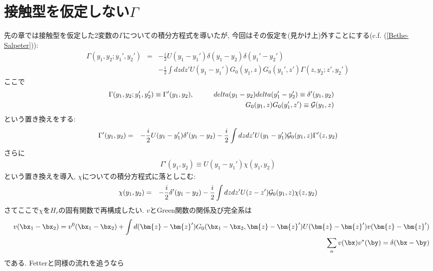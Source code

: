 \documentclass[10.5pt,a4paper]{jreport}
\begin{document}
\section{接触型を仮定しない$\Gamma$}
先の章では接触型を仮定した2変数の$\Gamma$についての積分方程式を導いたが, 今回はその仮定を(見かけ上)外すことにする(c.f. (\ref{Bethe-Salpeter})):
\begin{eqnarray}
\nonumber  \Gamma(y_1, y_2; y_1', y_2') &=& -\frac{i}{2}U(y_1 - y_1')\delta(y_1 - y_2)\delta(y_1' - y_2')\\
  &&- \frac{i}{2}\int dzdz' U(y_1 - y_1')G_0(y_1, z)G_0(y_1', z')\Gamma(z, y_2; z', y_2')
\end{eqnarray}
ここで
\begin{eqnarray}
  &&\Gamma(y_1, y_2;y_1', y_2') \equiv \Gamma'(y_1, y_2), \hspace{1cm}delta(y_1-y_2)delta(y_1'-y_2') \equiv \delta'(y_1, y_2)\\
  &&G_0(y_1, z)G_0(y_1', z') \equiv {\cal G}(y_1, z)
\end{eqnarray}
という置き換えをする:
\begin{eqnarray}
\nonumber  \Gamma'(y_1, y_2) &=& -\frac{i}{2}U(y_1 - y_1')\delta'(y_1 - y_2)- \frac{i}{2}\int dzdz' U(y_1 - y_1'){\cal G}_0(y_1, z)\Gamma'(z, y_2)
\end{eqnarray}
さらに
\begin{eqnarray}
  \Gamma'(y_1, y_2) \equiv U(y_1 - y_1')\chi(y_1, y_2)
\end{eqnarray}
という置き換えを導入, $\chi$についての積分方程式に落としこむ:
\begin{eqnarray}
\nonumber  \chi(y_1, y_2) &=& -\frac{i}{2}\delta'(y_1 - y_2)- \frac{i}{2}\int dzdz' U(z - z'){\cal G}_0(y_1, z)\chi(z, y_2)
\end{eqnarray}
さてここで$\chi$を$H_r$の固有関数で再構成したい. $v$とGreen関数の関係及び完全系は
\begin{eqnarray}
  &&v(\bx_1 - \bx_2) = v^0(\bx_1 - \bx_2) + \int d(\bm{z} - \bm{z}')G_0(\bx_1 - \bx_2, \bm{z} - \bm{z}')U(\bm{z} - \bm{z}')v(\bm{z} - \bm{z}')\\
  &&\sum_n v(\bx)v^*(\by) = \delta(\bx -\by)
\end{eqnarray}
である. Fetterと同様の流れを追うなら
\end{document}
